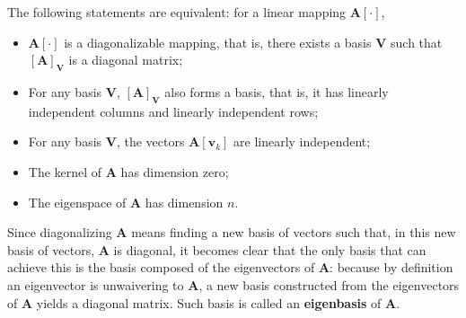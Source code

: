\begin{theorem} The following statements are equivalent: for a linear mapping $\mathbf{A}\left[\cdot\right]$,

\begin{itemize}
	\item $\mathbf{A}\left[\cdot\right]$ is a diagonalizable mapping, that is, there exists a basis $\mathbf{V}$ such that $\left[\mathbf{A}\right]_\mathbf{V}$ is a diagonal matrix;
	\item For any basis $\mathbf{V}$, $\left[\mathbf{A}\right]_\mathbf{V}$ also forms a basis, that is, it has linearly independent columns and linearly independent rows;
	\item For any basis $\mathbf{V}$, the vectors $\mathbf{A}\left[\mathbf{v}_k\right]$ are linearly independent;
	\item The kernel of $\mathbf{A}$ has dimension zero;
	\item The eigenspace of $\mathbf{A}$ has dimension $n$.
\end{itemize}
\end{theorem}

	Since diagonalizing $\mathbf{A}$ means finding a new basis of vectors such that, in this new basis of vectors, $\mathbf{A}$ is diagonal, it becomes clear that the only basis that can achieve this is the basis composed of the eigenvectors of $\mathbf{A}$: because by definition an eigenvector is unwaivering to $\mathbf{A}$, a new basis constructed from the eigenvectors of $\mathbf{A}$ yields a diagonal matrix. Such basis is called an \textbf{eigenbasis} of $\mathbf{A}$.

